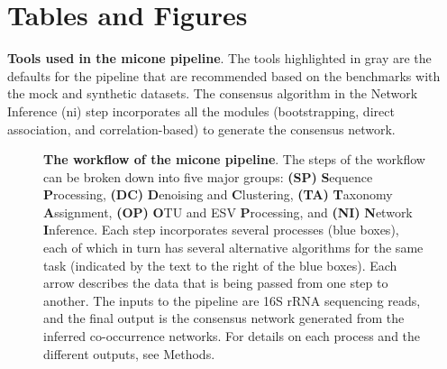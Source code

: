 
\newpage
\section*{Tables and Figures}


  \begin{table}[H]
    \centering
    \caption{
      \textbf{Tools used in the \ac{micone} pipeline}.
      The tools highlighted in gray are the defaults for the pipeline that are recommended based on the benchmarks with the mock and synthetic datasets.
      The consensus algorithm in the Network Inference (\ac{ni}) step incorporates all the modules (bootstrapping, direct association, and correlation-based) to generate the consensus network.
    }
    \label{tab:micone_tools}
  \end{table}


  \begin{figure}[H]
    \centering
    \caption{
      \textbf{The workflow of the \ac{micone} pipeline}.
      The steps of the workflow can be broken down into five major groups: \textbf{(SP)} \textbf{S}equence \textbf{P}rocessing, \textbf{(DC)} \textbf{D}enoising and \textbf{C}lustering, \textbf{(TA)} \textbf{T}axonomy \textbf{A}ssignment, \textbf{(OP)} \textbf{O}TU and ESV \textbf{P}rocessing, and \textbf{(NI)} \textbf{N}etwork \textbf{I}nference.
      Each step incorporates several processes (blue boxes), each of which in turn has several alternative algorithms for the same task (indicated by the text to the right of the blue boxes).
      Each arrow describes the data that is being passed from one step to another.
      The inputs to the pipeline are 16S rRNA sequencing reads, and the final output is the consensus network generated from the inferred co-occurrence networks.
      For details on each process and the different outputs, see Methods.
    }
    \label{fig:figure1}
  \end{figure}



